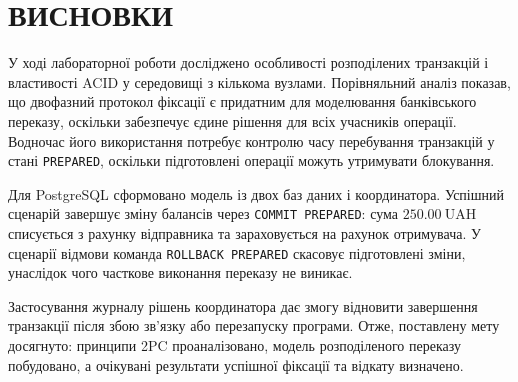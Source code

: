 \clearpage
\section*{ВИСНОВКИ}
{}

У ході лабораторної роботи досліджено особливості розподілених транзакцій і властивості ACID у середовищі з кількома вузлами. Порівняльний аналіз показав, що двофазний протокол фіксації є придатним для моделювання банківського переказу, оскільки забезпечує єдине рішення для всіх учасників операції. Водночас його використання потребує контролю часу перебування транзакцій у стані \texttt{PREPARED}, оскільки підготовлені операції можуть утримувати блокування.

Для PostgreSQL сформовано модель із двох баз даних і координатора. Успішний сценарій завершує зміну балансів через \texttt{COMMIT PREPARED}: сума \(250.00~\mathrm{UAH}\) списується з рахунку відправника та зараховується на рахунок отримувача. У сценарії відмови команда \texttt{ROLLBACK PREPARED} скасовує підготовлені зміни, унаслідок чого часткове виконання переказу не виникає.

Застосування журналу рішень координатора дає змогу відновити завершення транзакції після збою зв'язку або перезапуску програми. Отже, поставлену мету досягнуто: принципи 2PC проаналізовано, модель розподіленого переказу побудовано, а очікувані результати успішної фіксації та відкату визначено.